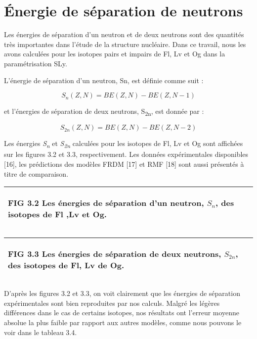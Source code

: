 \section{Énergie de séparation de neutrons}

 Les énergies de séparation d’un neutron et de deux neutrons sont des quantités très importantes dans l’étude de la structure nucléaire. Dans ce travail, nous les avons calculées pour les isotopes pairs et impairs de Fl, Lv et Og dans la paramétrisation SLy.

L’énergie de séparation d’un neutron, Sn, est définie comme suit :

   \begin{equation}S_n\left(Z,N\right)=\mathit{BE}\left(Z,N\right)-\mathit{BE}(Z,N-1)\end{equation} 

et l’énergies de séparation de deux neutrons, S\textsubscript{2n}, est donnée par :

\begin{equation}S_{2n}\left(Z,N\right)=\mathit{BE}\left(Z,N\right)-\mathit{BE}(Z,N-2)\end{equation} 

Les énergies \textit{S}\textit{\textsubscript{n}}\textit{ }et \textit{S}\textit{\textsubscript{2n}} calculées pour les isotopes de Fl, Lv et  Og sont affichées sur les figures 3.2 et 3.3, respectivement. Les données expérimentales disponibles [16], les prédictions des modèles FRDM [17] et RMF [18] sont aussi présentés à titre de comparaison.

\begin{flushleft}
\tablefirsthead{}
\tablehead{}
\tabletail{}
\tablelasttail{}
\begin{supertabular}{|m{6.31846in}|}
\hline
{\begin{french}  FIG 3.2 Les énergies de séparation d’un neutron,  $S_n$, des isotopes de Fl ,Lv et Og.\end{french}}\\\hline
\end{supertabular}
\end{flushleft}
\begin{flushleft}
\tablefirsthead{}
\tablehead{}
\tabletail{}
\tablelasttail{}
\begin{supertabular}{|m{6.31846in}|}
\hline
{\begin{french} FIG 3.3 Les énergies de séparation de deux neutrons,  $S_{2n}$, des isotopes de Fl, Lv de Og.\end{french}}\\\hline
\end{supertabular}
\end{flushleft}
 D’après les figures 3.2 et 3.3, on voit clairement que les énergies de séparation expérimentales sont bien reproduites par nos calculs. Malgré les légères différences dans le cas de certains isotopes, nos résultats ont l’erreur moyenne absolue la plus faible par rapport aux autres modèles, comme nous pouvons le voir dans le tableau 3.4.

